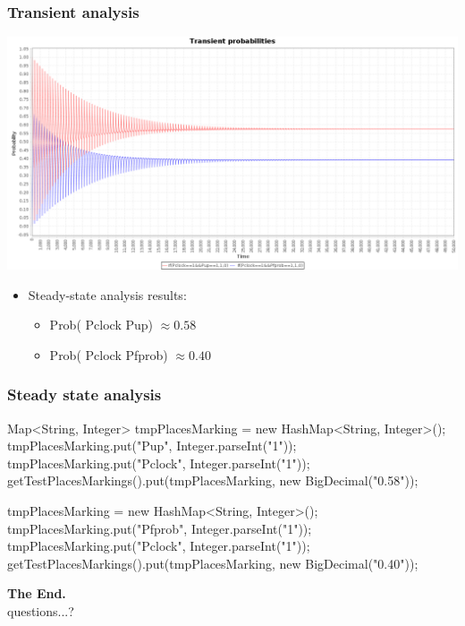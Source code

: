 \begin{frame}
  \frametitle{Transient analysis}
  \begin{center}
    \includegraphics[width=\textwidth]{img/rejuvenationTrans.png}    
  \end{center}
  \pause
  \begin{itemize}
  	\item Steady-state analysis results:
  	\pause
  	\begin{itemize}
  		\item Prob({\color{red} Pclock Pup}) $\approx 0.58$
  		\item Prob({\color{blue} Pclock Pfprob}) $\approx 0.40$
  	\end{itemize}
  \end{itemize}
\end{frame}

\begin{frame}[fragile]
  \frametitle{Steady state analysis}
  \footnotesize
  \begin{jblock}
Map<String, Integer> tmpPlacesMarking = new HashMap<String, Integer>();
tmpPlacesMarking.put("Pup", Integer.parseInt("1"));
tmpPlacesMarking.put("Pclock", Integer.parseInt("1"));
getTestPlacesMarkings().put(tmpPlacesMarking, new BigDecimal("0.58"));

tmpPlacesMarking = new HashMap<String, Integer>();
tmpPlacesMarking.put("Pfprob", Integer.parseInt("1"));
tmpPlacesMarking.put("Pclock", Integer.parseInt("1"));
getTestPlacesMarkings().put(tmpPlacesMarking, new BigDecimal("0.40"));
  \end{jblock}
\end{frame}

\begin{frame}
  \begin{center}
	\textbf{\Huge The End.}\\[3cm]
	\pause
	{\huge questions...?}
  \end{center}
\end{frame}
